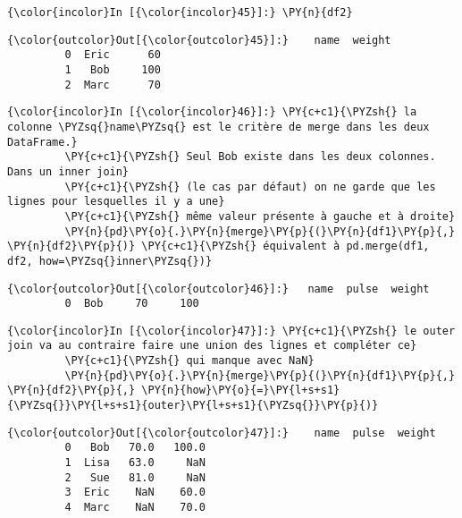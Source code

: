     \begin{Verbatim}[commandchars=\\\{\}]
{\color{incolor}In [{\color{incolor}45}]:} \PY{n}{df2}
\end{Verbatim}


\begin{Verbatim}[commandchars=\\\{\}]
{\color{outcolor}Out[{\color{outcolor}45}]:}    name  weight
         0  Eric      60
         1   Bob     100
         2  Marc      70
\end{Verbatim}
            
    \begin{Verbatim}[commandchars=\\\{\}]
{\color{incolor}In [{\color{incolor}46}]:} \PY{c+c1}{\PYZsh{} la colonne \PYZsq{}name\PYZsq{} est le critère de merge dans les deux DataFrame.}
         \PY{c+c1}{\PYZsh{} Seul Bob existe dans les deux colonnes. Dans un inner join}
         \PY{c+c1}{\PYZsh{} (le cas par défaut) on ne garde que les lignes pour lesquelles il y a une}
         \PY{c+c1}{\PYZsh{} même valeur présente à gauche et à droite}
         \PY{n}{pd}\PY{o}{.}\PY{n}{merge}\PY{p}{(}\PY{n}{df1}\PY{p}{,} \PY{n}{df2}\PY{p}{)} \PY{c+c1}{\PYZsh{} équivalent à pd.merge(df1, df2, how=\PYZsq{}inner\PYZsq{})}
\end{Verbatim}


\begin{Verbatim}[commandchars=\\\{\}]
{\color{outcolor}Out[{\color{outcolor}46}]:}   name  pulse  weight
         0  Bob     70     100
\end{Verbatim}
            
    \begin{Verbatim}[commandchars=\\\{\}]
{\color{incolor}In [{\color{incolor}47}]:} \PY{c+c1}{\PYZsh{} le outer join va au contraire faire une union des lignes et compléter ce}
         \PY{c+c1}{\PYZsh{} qui manque avec NaN}
         \PY{n}{pd}\PY{o}{.}\PY{n}{merge}\PY{p}{(}\PY{n}{df1}\PY{p}{,} \PY{n}{df2}\PY{p}{,} \PY{n}{how}\PY{o}{=}\PY{l+s+s1}{\PYZsq{}}\PY{l+s+s1}{outer}\PY{l+s+s1}{\PYZsq{}}\PY{p}{)}
\end{Verbatim}


\begin{Verbatim}[commandchars=\\\{\}]
{\color{outcolor}Out[{\color{outcolor}47}]:}    name  pulse  weight
         0   Bob   70.0   100.0
         1  Lisa   63.0     NaN
         2   Sue   81.0     NaN
         3  Eric    NaN    60.0
         4  Marc    NaN    70.0
\end{Verbatim}
            
